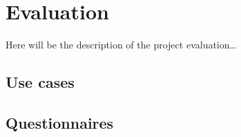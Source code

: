\chapter{Evaluation}

Here will be the description of the project evaluation\ldots

\nlipsum


\section{Use cases}
\nlipsum


\section{Questionnaires}
\nlipsum


\begin{comment}
To evaluate this project's hypotheses~(see \secref{hypotheses}), both versions of the developed tool will be subjected to a number of user studies. Currently, however, the presumed user base is limited to only a small number of researchers. Luckily, project supervisors Klau and El-Kebir keep a close connection with most of those researchers, who work at VU University Amsterdam. They have shown some interest in the tool and are willing to participate in the user studies. Furthermore, as some of the researchers are also teaching, they can ask some of their students to evaluate the tool as well. It is not possible to ask random students, as they will lack domain knowledge, making their results unreliable~\cite{jonassen2000toward}. The researchers' students are considered to have enough domain knowledge to be able to correctly parameterise a molecule.

In the user studies, the test subjects will be split up in two groups, where each subject is randomly assigned to a group and both groups are of equal size and equal student-scientist ratio. This way, it is made sure that both groups are representative, which is essential for user studies~\cite{wohlin2003empirical}~(see also \secref{user_studies}).

The groups will take part in an experiment that compares the two versions of the molecule parameterisation tool~\cite{wohlin2003empirical}. One group will test the naive version, the other will use the smart one. For both groups, every member will be asked to parameterise a few molecules of increasing size and complexity. The first one will be quite easy to complete, but the last one should be of such complexity that, theoretically, using the tool is beneficial over using conventional quantum mechanical calculations. It is in these last situations that the tool should show its true value.


\end{comment}
